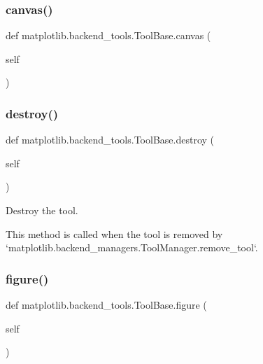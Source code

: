 \subsubsection{\texorpdfstring{canvas()}{canvas()}}
{\footnotesize\ttfamily def matplotlib.\+backend\+\_\+tools.\+Tool\+Base.\+canvas (\begin{DoxyParamCaption}\item[{}]{self }\end{DoxyParamCaption})}

\mbox{\label{classmatplotlib_1_1backend__tools_1_1ToolBase_aa43bb065c57c164cf457d9d46765ca96}} 
\subsubsection{\texorpdfstring{destroy()}{destroy()}}
{\footnotesize\ttfamily def matplotlib.\+backend\+\_\+tools.\+Tool\+Base.\+destroy (\begin{DoxyParamCaption}\item[{}]{self }\end{DoxyParamCaption})}

\begin{DoxyVerb}Destroy the tool.

This method is called when the tool is removed by
`matplotlib.backend_managers.ToolManager.remove_tool`.
\end{DoxyVerb}
 \mbox{\label{classmatplotlib_1_1backend__tools_1_1ToolBase_af85e83d1db0787aa40d06837204651ee}} 
\subsubsection{\texorpdfstring{figure()}{figure()}\hspace{0.1cm}{\footnotesize\ttfamily [1/2]}}
{\footnotesize\ttfamily def matplotlib.\+backend\+\_\+tools.\+Tool\+Base.\+figure (\begin{DoxyParamCaption}\item[{}]{self }\end{DoxyParamCaption})}

